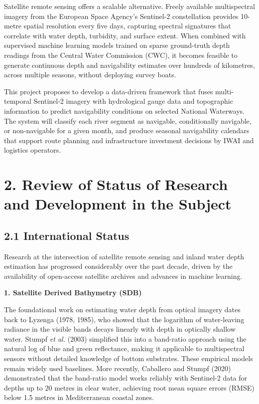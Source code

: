 \documentclass[12pt,a4paper]{article}
\begin{document}
Satellite remote sensing offers a scalable alternative. Freely available multispectral imagery from the European Space Agency's Sentinel-2 constellation provides 10-metre spatial resolution every five days, capturing spectral signatures that correlate with water depth, turbidity, and surface extent. When combined with supervised machine learning models trained on sparse ground-truth depth readings from the Central Water Commission (CWC), it becomes feasible to generate continuous depth and navigability estimates over hundreds of kilometres, across multiple seasons, without deploying survey boats.

This project proposes to develop a data-driven framework that fuses multi-temporal Sentinel-2 imagery with hydrological gauge data and topographic information to predict navigability conditions on selected National Waterways. The system will classify each river segment as navigable, conditionally navigable, or non-navigable for a given month, and produce seasonal navigability calendars that support route planning and infrastructure investment decisions by IWAI and logistics operators.

\newpage
\section*{2. Review of Status of Research and Development in the Subject}

\subsection*{2.1 International Status}

Research at the intersection of satellite remote sensing and inland water depth estimation has progressed considerably over the past decade, driven by the availability of open-access satellite archives and advances in machine learning.

\textbf{1. Satellite Derived Bathymetry (SDB)}

The foundational work on estimating water depth from optical imagery dates back to Lyzenga (1978, 1985), who showed that the logarithm of water-leaving radiance in the visible bands decays linearly with depth in optically shallow water. Stumpf \textit{et al.} (2003) simplified this into a band-ratio approach using the natural log of blue and green reflectance, making it applicable to multispectral sensors without detailed knowledge of bottom substrates. These empirical models remain widely used baselines. More recently, Caballero and Stumpf (2020) demonstrated that the band-ratio model works reliably with Sentinel-2 data for depths up to 20 metres in clear water, achieving root mean square errors (RMSE) below 1.5 metres in Mediterranean coastal zones.
\end{document}
